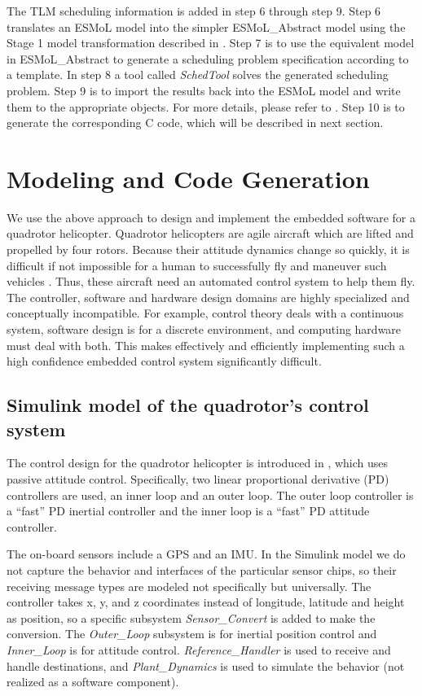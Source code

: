 \documentclass{acm_proc_article-sp}
\begin{document}
The TLM scheduling information is added in step 6 through step 9. Step 6 translates an ESMoL model into the simpler ESMoL\_Abstract model using the Stage 1 model transformation described in \cite{modeling:esmol}. Step 7 is to use the equivalent model in ESMoL\_Abstract to generate a scheduling problem specification according to a template. In step 8 a tool called \emph{SchedTool} solves the generated scheduling problem. Step 9 is to import the results back into the ESMoL model and write them to the appropriate objects. For more details, please refer to \cite{modeling:esmol}. Step 10 is to generate the corresponding C code, which will be described in next section.


\section{Modeling and Code Generation}

We use the above approach to design and implement the embedded software for a quadrotor helicopter. Quadrotor helicopters are agile aircraft which are lifted and propelled by four rotors. Because their attitude dynamics change so quickly, it is difficult if not impossible for a human to successfully fly and maneuver such vehicles \cite{quad:passcontrol}. Thus, these aircraft need an automated control system to help them fly. The controller, software and hardware design domains are highly specialized and conceptually incompatible. For example, control theory deals with a continuous system, software design is for a discrete environment, and computing hardware must deal with both. This makes effectively and efficiently implementing such a high confidence embedded control system significantly difficult.

\subsection{Simulink model of the quadrotor's control system}

The control design for the quadrotor helicopter is introduced in \cite{quad:passcontrol}, which uses passive attitude control. Specifically, two linear proportional derivative (PD) controllers are used, an inner loop and an outer loop. The outer loop controller is a ``fast'' PD inertial controller and the inner loop is a ``fast'' PD attitude controller.

The on-board sensors include a GPS and an IMU. In the Simulink model we do not capture the behavior and interfaces of the particular sensor chips, so their receiving message types are modeled not specifically but universally. The controller takes x, y, and z coordinates instead of longitude, latitude and height as position, so a specific subsystem \emph{Sensor\_Convert} is added to make the conversion. The \emph{Outer\_Loop} subsystem is for inertial position control and \emph{Inner\_Loop} is for attitude control. \emph{Reference\_Handler} is used to receive and handle destinations, and \emph{Plant\_Dynamics} is used to simulate the behavior (not realized as a software component).
\end{document}
